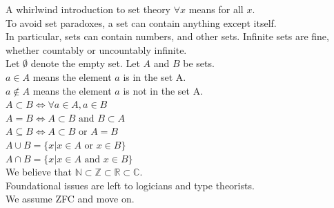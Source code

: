 \documentclass{beamer}
\begin{document}


\begin{frame}{A whirlwind introduction to set theory}
$\forall x$ means for all $x$.\\
To avoid set paradoxes, a set can contain anything except itself.\\
In particular, sets can contain numbers, and other sets.
Infinite sets are fine, whether countably or uncountably infinite.\\
Let $\emptyset$ denote the empty set.
Let $A$ and $B$ be sets.\\
$a \in A$ means the element $a$ is in the set A.\\
$a \notin A$ means the element $a$ is not in the set A.\\
$A \subset B \Leftrightarrow \forall a \in A, a \in B$\\
$A = B \Leftrightarrow A \subset B \text{ and } B \subset A$\\
$A \subseteq B \Leftrightarrow A \subset B \text{ or } A = B$\\
$A \cup B = \{x | x \in A \text{ or } x \in B\}$\\
$A \cap B = \{x | x \in A \text{ and } x \in B\}$\\
We believe that $\mathbb{N} \subset \mathbb{Z} \subset \mathbb{R} \subset \mathbb{C}$.\\
Foundational issues are left to logicians and type theorists.\\
We assume ZFC and move on.
\end{frame}
\end{document}
